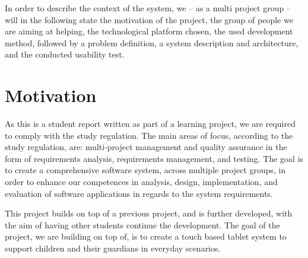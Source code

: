 In order to describe the context of the system, we -- as a multi project group -- will in the following state the motivation of the project, the group of people we are aiming at helping, the technological platform chosen, the used development method, followed by a problem definition, a system description and architecture, and the conducted usability test.

\section{Motivation}
As this is a student report written as part of a learning project, we are required to comply with the study regulation.
The main areas of focus, according to the study regulation, are: multi-project management and quality assurance in the form of requirements analysis, requirements management, and testing.
The goal is to create a comprehensive software system, across multiple project groups, in order to enhance our competences in analysis, design, implementation, and evaluation of software applications in regards to the system requirements\cite{studyreg}.

This project builds on top of a previous project, and is further developed, with the aim of having other students continue the development.
The goal of the project, we are building on top of, is to create a touch based tablet system to support children and their guardians in everyday scenarios.